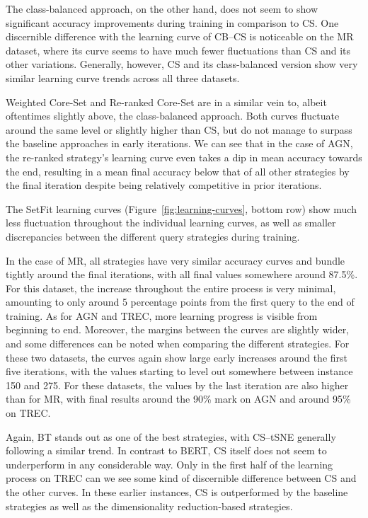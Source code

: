 \documentclass[english,bachelor,ul]{webisthesis} %
\begin{document}
The class-balanced approach, on the other hand, does not seem to show significant accuracy improvements during training in comparison to CS. One discernible difference with the learning curve of CB--CS is noticeable on the MR dataset, where its curve seems to have much fewer fluctuations than CS and its other variations. Generally, however, CS and its class-balanced version show very similar learning curve trends across all three datasets. 

Weighted Core-Set and Re-ranked Core-Set are in a similar vein to, albeit oftentimes slightly above, the class-balanced approach. Both curves fluctuate around the same level or slightly higher than CS, but do not manage to surpass the baseline approaches in early iterations. We can see that in the case of AGN, the re-ranked strategy's learning curve even takes a dip in mean accuracy towards the end, resulting in a mean final accuracy below that of all other strategies by the final iteration despite being relatively competitive in prior iterations.

The SetFit learning curves (Figure~\ref{fig:learning-curves}, bottom row) show much less fluctuation throughout the individual learning curves, as well as smaller discrepancies between the different query strategies during training. 

In the case of MR, all strategies have very similar accuracy curves and bundle tightly around the final iterations, with all final values somewhere around 87.5\%. For this dataset, the increase throughout the entire process is very minimal, amounting to only around 5 percentage points from the first query to the end of training. As for AGN and TREC, more learning progress is visible from beginning to end. Moreover, the margins between the curves are slightly wider, and some differences can be noted when comparing the different strategies. For these two datasets, the curves again show large early increases around the first five iterations, with the values starting to level out somewhere between instance 150 and 275. For these datasets, the values by the last iteration are also higher than for MR, with final results around the 90\% mark on AGN and around 95\% on TREC.

Again, BT stands out as one of the best strategies, with CS--tSNE generally following a similar trend. In contrast to BERT, CS itself does not seem to underperform in any considerable way. Only in the first half of the learning process on TREC can we see some kind of discernible difference between CS and the other curves. In these earlier instances, CS is outperformed by the baseline strategies as well as the dimensionality reduction-based strategies. 
\end{document}
